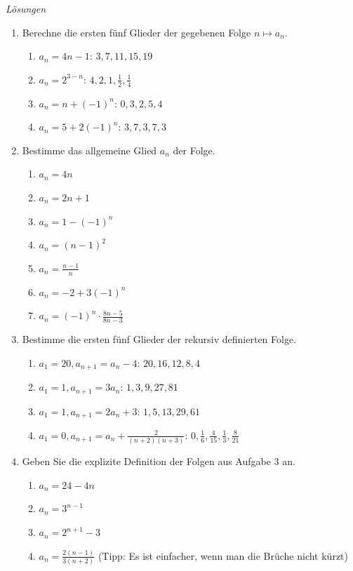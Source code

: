 \clearpage
\emph{Lösungen}
\begin{enumerate}
    \item Berechne die ersten fünf Glieder der gegebenen Folge $n \mapsto a_n$.
    \begin{enumerate}
        \item $a_n = 4n - 1$: \quad $3, 7, 11, 15, 19$
        \item $a_n = 2^{3-n}$: \quad $4, 2, 1, \frac{1}{2}, \frac{1}{4}$
        \item $a_n = n + (-1)^n$: \quad $0, 3, 2, 5, 4$
        \item $a_n = 5 + 2(-1)^n$: \quad $3, 7, 3, 7, 3$
    \end{enumerate}

    \item Bestimme das allgemeine Glied $a_n$ der Folge.
    \begin{enumerate}
        \item $a_n = 4n$
        \item $a_n = 2n + 1$
        \item $a_n = 1 - (-1)^n$
        \item $a_n = (n-1)^2$
        \item $a_n = \frac{n-1}{n}$
        \item $a_n = -2 + 3(-1)^n$
        \item $a_n = (-1)^n \cdot \frac{8n-5}{8n-3}$
    \end{enumerate}

    \item Bestimme die ersten fünf Glieder der rekursiv definierten Folge.
    \begin{enumerate}
        \item $a_1 = 20, a_{n+1} = a_n - 4$: \quad $20, 16, 12, 8, 4$
        \item $a_1 = 1, a_{n+1} = 3 a_n$: \quad $1, 3, 9, 27, 81$
        \item $a_1 = 1, a_{n+1} = 2 a_n + 3$: \quad $1, 5, 13, 29, 61$
        \item $a_1 = 0, a_{n+1} = a_n + \frac{2}{(n+2)(n+3)}$: \quad $0, \frac{1}{6}, \frac{4}{15}, \frac{1}{3}, \frac{8}{21}$
    \end{enumerate}

    \item Geben Sie die explizite Definition der Folgen aus Aufgabe 3 an.
    \begin{enumerate}
        \item $a_n = 24 - 4n$
        \item $a_n = 3^{n-1}$
        \item $a_n =2^{n+1}-3$
        \item $a_n =\frac{2 (n-1)}{3(n+2)}$ (Tipp: Es ist einfacher, wenn man die Brüche nicht kürzt) 
    \end{enumerate}


\end{enumerate}
